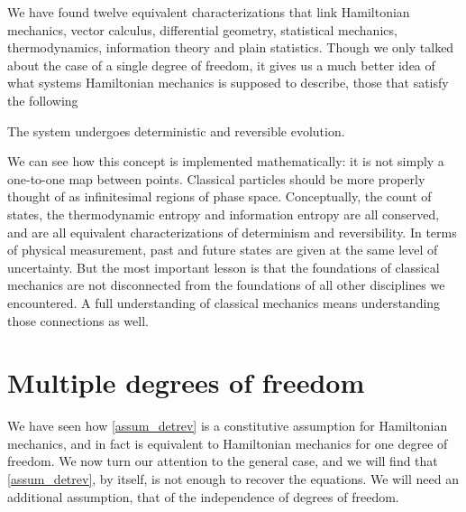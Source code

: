 We have found twelve equivalent characterizations that link Hamiltonian mechanics, vector calculus, differential geometry, statistical mechanics, thermodynamics, information theory and plain statistics. Though we only talked about the case of a single degree of freedom, it gives us a much better idea of what systems Hamiltonian mechanics is supposed to describe, those that satisfy the following
\renewcommand{\theassump}{DR}
\begin{assump}\label{assum_detrev}
	The system undergoes deterministic and reversible evolution.
\end{assump}
\renewcommand{\theassump}{\Roman{assump}}
We can see how this concept is implemented mathematically: it is not simply a one-to-one map between points. Classical particles should be more properly thought of as infinitesimal regions of phase space. Conceptually, the count of states, the thermodynamic entropy and information entropy are all conserved, and are all equivalent characterizations of determinism and reversibility. In terms of physical measurement, past and future states are given at the same level of uncertainty. But the most important lesson is that the foundations of classical mechanics are not disconnected from the foundations of all other disciplines we encountered. A full understanding of classical mechanics means understanding those connections as well.

\section{Multiple degrees of freedom}

We have seen how \ref{assum_detrev} is a constitutive assumption for Hamiltonian mechanics, and in fact is equivalent to Hamiltonian mechanics for one degree of freedom. We now turn our attention to the general case, and we will find that \ref{assum_detrev}, by itself, is not enough to recover the equations. We will need an additional assumption, that of the independence of degrees of freedom.

